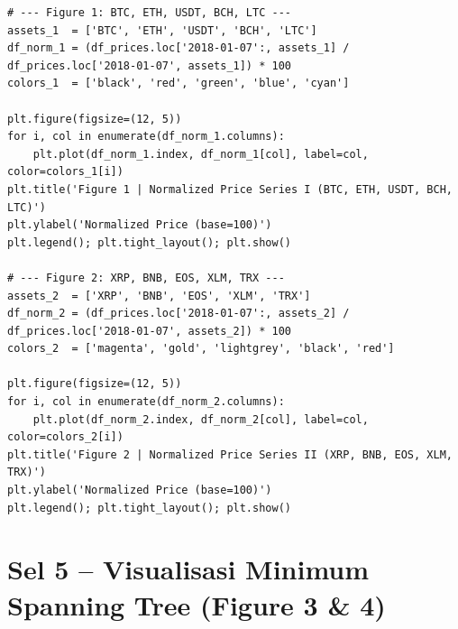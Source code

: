 \documentclass[12pt,a4paper]{article}
\begin{document}
\begin{lstlisting}[caption={Dua set plot harga ternormalisasi}]
# --- Figure 1: BTC, ETH, USDT, BCH, LTC ---
assets_1  = ['BTC', 'ETH', 'USDT', 'BCH', 'LTC']
df_norm_1 = (df_prices.loc['2018-01-07':, assets_1] / df_prices.loc['2018-01-07', assets_1]) * 100
colors_1  = ['black', 'red', 'green', 'blue', 'cyan']

plt.figure(figsize=(12, 5))
for i, col in enumerate(df_norm_1.columns):
    plt.plot(df_norm_1.index, df_norm_1[col], label=col, color=colors_1[i])
plt.title('Figure 1 | Normalized Price Series I (BTC, ETH, USDT, BCH, LTC)')
plt.ylabel('Normalized Price (base=100)')
plt.legend(); plt.tight_layout(); plt.show()

# --- Figure 2: XRP, BNB, EOS, XLM, TRX ---
assets_2  = ['XRP', 'BNB', 'EOS', 'XLM', 'TRX']
df_norm_2 = (df_prices.loc['2018-01-07':, assets_2] / df_prices.loc['2018-01-07', assets_2]) * 100
colors_2  = ['magenta', 'gold', 'lightgrey', 'black', 'red']

plt.figure(figsize=(12, 5))
for i, col in enumerate(df_norm_2.columns):
    plt.plot(df_norm_2.index, df_norm_2[col], label=col, color=colors_2[i])
plt.title('Figure 2 | Normalized Price Series II (XRP, BNB, EOS, XLM, TRX)')
plt.ylabel('Normalized Price (base=100)')
plt.legend(); plt.tight_layout(); plt.show()
\end{lstlisting}

\section{Sel 5 -- Visualisasi Minimum Spanning Tree (Figure 3 \& 4)}
\end{document}

